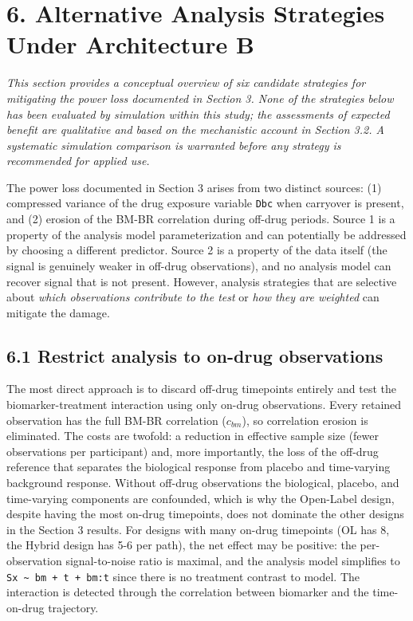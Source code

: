 \documentclass[
  11pt,
]{article}
\begin{document}
\section{6. Alternative Analysis Strategies Under Architecture B}

\emph{This section provides a conceptual overview of six
candidate strategies for mitigating the power loss documented in
Section 3. None of the strategies below has been evaluated
by simulation within this study; the assessments of expected
benefit are qualitative and based on the mechanistic account
in Section 3.2. A systematic simulation comparison is warranted
before any strategy is recommended for applied use.}

The power loss documented in Section 3 arises from two distinct sources:
(1) compressed variance of the drug exposure variable \texttt{Dbc} when
carryover is present, and (2) erosion of the BM-BR correlation during
off-drug periods. Source 1 is a property of the analysis model
parameterization and can potentially be addressed by choosing a
different predictor. Source 2 is a property of the data itself (the
signal is genuinely weaker in off-drug observations), and no analysis
model can recover signal that is not present. However, analysis
strategies that are selective about \textit{which observations
contribute to the test} or \textit{how they are weighted} can mitigate
the damage.

\subsection{6.1 Restrict analysis to on-drug observations}

The most direct approach is to discard off-drug timepoints entirely and
test the biomarker-treatment interaction using only on-drug
observations. Every retained observation has the full BM-BR correlation
(\(c_{bm}\)), so correlation erosion is eliminated. The costs are
twofold: a reduction in effective sample size (fewer observations per
participant) and, more importantly, the loss of the off-drug reference
that separates the biological response from placebo and time-varying
background response. Without off-drug observations the biological,
placebo, and time-varying components are confounded, which is why the
Open-Label design, despite having the most on-drug timepoints, does not
dominate the other designs in the Section 3 results. For designs with
many on-drug timepoints (OL has 8, the Hybrid design has 5-6 per path),
the net effect may be positive: the per-observation signal-to-noise
ratio is maximal, and the analysis model simplifies to
\texttt{Sx \textasciitilde{} bm + t + bm:t} since there is no treatment
contrast to model. The interaction is detected through the correlation
between biomarker and the time-on-drug trajectory.
\end{document}

